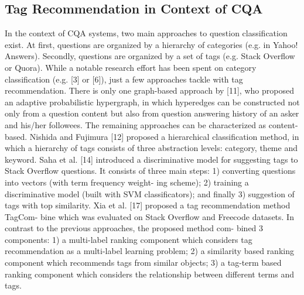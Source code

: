\documentclass{sig-alternate}
\begin{document}
\subsection{Tag Recommendation in Context of CQA
}
In the context of CQA systems, two main approaches to question
classification exist. At first, questions are organized by a hierarchy
of categories (e.g. in Yahoo! Answers). Secondly, questions are
organized by a set of tags (e.g. Stack Overflow or Quora). While a
notable research effort has been spent on category classification (e.g.
[3] or [6]), just a few approaches tackle with tag recommendation.
There is only one graph-based approach by [11], who proposed
an adaptive probabilistic hypergraph, in which hyperedges can be
constructed not only from a question content but also from question
answering history of an asker and his/her followees. The remaining
approaches can be characterized as content-based.
Nishida and Fujimura [12] proposed a hierarchical classification
method, in which a hierarchy of tags consists of three abstraction
levels: category, theme and keyword.
Saha et al. [14] introduced a discriminative model for suggesting
tags to Stack Overflow questions. It consists of three main steps:
1) converting questions into vectors (with term frequency weight-
ing scheme); 2) training a discriminative model (built with SVM
classificators); and finally 3) suggestion of tags with top similarity.
Xia et al. [17] proposed a tag recommendation method TagCom-
bine which was evaluated on Stack Overflow and Freecode datasets.
In contrast to the previous approaches, the proposed method com-
bined 3 components: 1) a multi-label ranking component which
considers tag recommendation as a multi-label learning problem;
2) a similarity based ranking component which recommends tags
from similar objects; 3) a tag-term based ranking component which
considers the relationship between different terms and tags.

\end{document}

